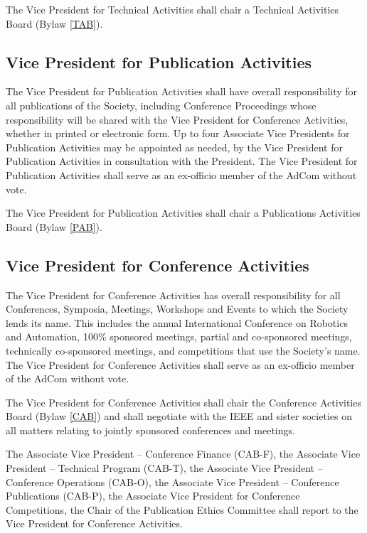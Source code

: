 \documentclass[10pt]{article}
\newcommand{\blref}[1]{Bylaw \ref{#1}}
\begin{document}
The Vice President for Technical Activities shall chair a Technical Activities Board (\blref{TAB}). 



\subsection{Vice President for Publication Activities}

The Vice President for Publication Activities shall have overall responsibility for all publications of the Society, including Conference Proceedings whose responsibility will be shared with the Vice President for Conference Activities, whether in printed or electronic form.  Up to four Associate Vice Presidents for Publication Activities may be appointed as needed, by the Vice President for Publication Activities in consultation with the President. The Vice President for Publication Activities shall serve as an ex-officio member of the AdCom without vote.

The Vice President for Publication Activities shall chair a Publications Activities Board (\blref{PAB}). 



\subsection{Vice President for Conference Activities}

The Vice President for Conference Activities has overall responsibility for all Conferences, Symposia, Meetings, Workshops and Events to which the Society lends its name. This includes the annual International Conference on Robotics and Automation, 100\% sponsored meetings, partial and co-sponsored meetings, technically co-sponsored meetings, and competitions that use the Society's name. The Vice President for Conference Activities shall serve as an ex-officio member of the AdCom without vote.

The Vice President for Conference Activities shall chair the Conference Activities Board (\blref{CAB}) and shall negotiate with the IEEE and sister societies on all matters relating to jointly sponsored conferences and meetings.  

The Associate Vice President – Conference Finance (CAB-F), the Associate Vice President – Technical Program (CAB-T), the Associate Vice President – Conference Operations (CAB-O), the Associate Vice President – Conference Publications (CAB-P), the Associate Vice President for Conference Competitions, the Chair of the Publication Ethics Committee shall report to the Vice President for Conference Activities.
\end{document}
